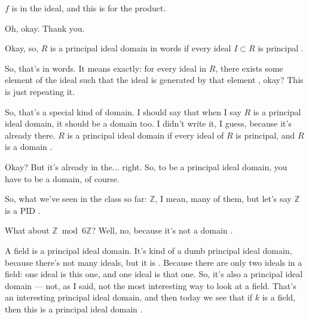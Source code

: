 \begin{speech}[00:40:09 - 00:40:29]
$f$ is in the ideal, and this is for the product.
\end{speech}

\begin{student}
Oh, okay. Thank you.
\end{student}

\begin{speech}[00:40:29 - 00:41:37]
Okay, so, $R$ is a principal ideal domain in words if every ideal $I \subset R$ is principal .

So, that's in words. It means exactly: for every ideal in $R$, there exists some element of the ideal such that the ideal is generated by that element , okay? This is just repeating it.

So, that's a special kind of domain. I should say that when I say $R$ is a principal ideal domain, it should be a domain too. I didn't write it, I guess, because it's already there. $R$ is a principal ideal domain if every ideal of $R$ is principal, and $R$ is a domain .

Okay? But it's already in the... right. So, to be a principal ideal domain, you have to be a domain, of course.

So, what we've seen in the class so far: $\mathbb{Z}$, I mean, many of them, but let's say $\mathbb{Z}$ is a PID .

What about $\mathbb{Z} \bmod 6\mathbb{Z}$?  Well, no, because it's not a domain .

A field is a principal ideal domain. It's kind of a dumb principal ideal domain, because there's not many ideals, but it is . Because there are only two ideals in a field: one ideal is this one, and one ideal is that one. So, it's also a principal ideal domain --- not, as I said, not the most interesting way to look at a field. That's an interesting principal ideal domain, and then today we see that if $k$ is a field, then this is a principal ideal domain .
\end{speech}

